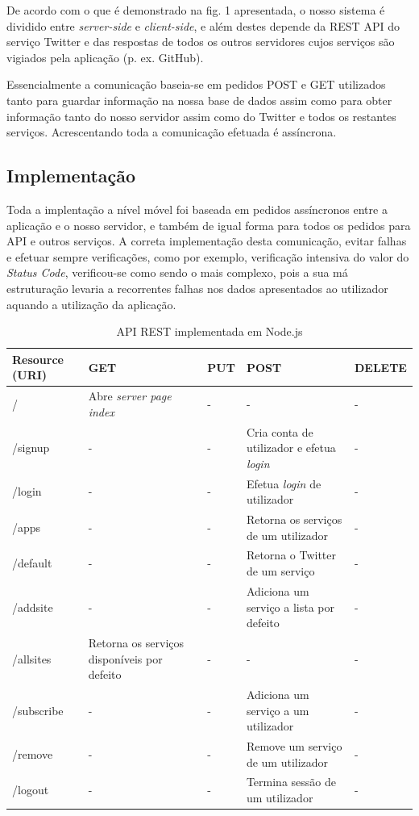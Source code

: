 \documentclass[12pt]{article}
\begin{document}
De acordo com o que é demonstrado na fig. 1 apresentada, o nosso sistema é dividido entre \textit{server-side} e \textit{client-side}, e além destes depende da REST API do serviço Twitter e das respostas de todos os outros servidores cujos serviços são vigiados pela aplicação (p. ex. GitHub).
	
	Essencialmente a comunicação baseia-se em pedidos POST e GET utilizados tanto para guardar informação na nossa base de dados assim como para obter informação tanto do nosso servidor assim como do Twitter e todos os restantes serviços. Acrescentando toda a comunicação efetuada é assíncrona.

\subsection{Implementação}

Toda a implentação a nível móvel foi baseada em pedidos assíncronos entre a aplicação e o nosso servidor, e também de igual forma para todos os pedidos para API e outros serviços. A correta implementação desta comunicação, evitar falhas e efetuar sempre verificações, como por exemplo, verificação intensiva do valor do \textit{Status Code}, verificou-se como sendo o mais complexo, pois a sua má estruturação levaria a recorrentes falhas nos dados apresentados ao utilizador aquando a utilização da aplicação. 

\renewcommand{\arraystretch}{1.5}
\begin{table}[h!]
\begin{tabular}{p{2cm}|p{2.5cm}|p{2.5cm}|p{2.5cm}|p{2cm}}
Resource (URI) & GET  & PUT & POST  & DELETE  \\\hline
/ & Abre \textit{server page index} &  - & - &  - \\\hline
/signup &  -& - & Cria conta de utilizador e efetua \textit{login}  &- \\\hline
/login &-  &-  & Efetua \textit{login} de utilizador & - \\\hline
/apps &  -& - & Retorna os serviços de um utilizador &-  \\\hline
/default & - & - & Retorna o Twitter de um serviço &-  \\\hline
/addsite &  -& - &Adiciona um serviço a lista por defeito &-  \\\hline
/allsites &  Retorna os serviços disponíveis por defeito &-  &- & - \\\hline
/subscribe &-  &  -&Adiciona um serviço a um utilizador& - \\\hline
/remove & - &  -& Remove um serviço de um utilizador & - \\\hline
/logout &  -& - & Termina sessão de um utilizador &-  \\\hline
\end{tabular}
\caption{API REST implementada em Node.js}
\end{table}
\end{document}
